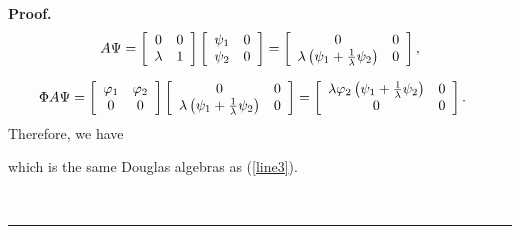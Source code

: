 \documentclass{article}%
\newenvironment{proof}[1][Proof]{\noindent\textbf{#1.} }{\ \rule{0.5em}{0.5em}}
\begin{document}
\begin{proof}
\begin{align}
A\Psi= \left[
\begin{array}
[c]{cc}%
0 & 0\\
\lambda & 1
\end{array}
\right]  \left[
\begin{array}
[c]{cc}%
\psi_{1} & 0\\
\psi_{2} & 0
\end{array}
\right]  =\left[
\begin{array}
[c]{cc}%
0 & 0\\
\lambda\left(  \psi_{1}+\frac{1}{\lambda}\psi_{2}\right)  & 0
\end{array}
\right]  ,\nonumber
\end{align}
%

\begin{align}
\Phi A\Psi &  =\left[
\begin{array}
[c]{cc}%
\varphi_{1} & \varphi_{2}\\
0 & 0
\end{array}
\right]  \left[
\begin{array}
[c]{cc}%
0 & 0\\
\lambda\left(  \psi_{1}+\frac{1}{\lambda}\psi_{2}\right)  & 0
\end{array}
\right]  =\left[
\begin{array}
[c]{cc}%
\lambda\varphi_{2} \left(  \psi_{1}+\frac{1}{\lambda}\psi_{2}\right)  & 0\\
0 & 0
\end{array}
\right]  .\nonumber
\end{align}
Therefore, we have 
which is the same Douglas algebras as (\ref{line3}).


\end{proof}
\end{document}
